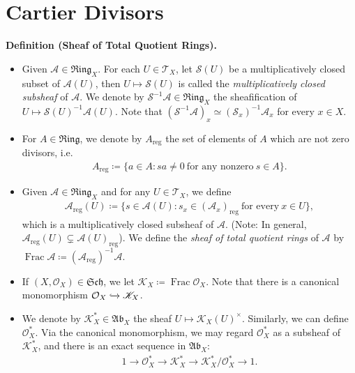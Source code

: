 \documentclass[11pt,a4paper,footinclude=true,headinclude=true]{scrbook} %
\DeclareMathOperator{\Frac}{Frac}
\newcommand{\KK}{\mathscr{K}}
\newcommand{\OO}{\mathcal{O}}
\newcommand{\Ss}{\mathscr{S}}
\newcommand{\TT}{\mathcal{T}}
\newcommand{\Aa}{\mathscr{A}}
\newcommand{\reg}{\mathrm{reg}}
\newcommand{\Sch}{\mathfrak{Sch}}
\newcommand{\Ab}{\mathfrak{Ab}}
\newcommand{\Ring}{\mathfrak{Ring}}
\newcommand{\<}{\langle}
\newcommand{\>}{\rangle}
\newenvironment{definition}[2][Definition]
    { \begin{mdframed}[backgroundcolor=gray!20] \textbf{#1 #2.}\ }
    {  \end{mdframed}}
\begin{document}
\section{Cartier Divisors}
\begin{definition}{(Sheaf of Total Quotient Rings)}
    \begin{itemize}
        \item Given $\Aa\in\Ring_X$. For each $U\in\TT_X$, let $\Ss(U)$ be a multiplicatively closed subset of $\Aa(U)$, then $U\mapsto\Ss(U)$ is called the \textit{multiplicatively closed subsheaf} of $\Aa$. We denote by $\Ss^{-1}\Aa\in\Ring_X$ the sheafification of $U\mapsto\Ss(U)^{-1}\Aa(U)$. Note that $(\Ss^{-1}\Aa)_x\simeq(\Ss_x)^{-1}\Aa_x$ for every $x\in X$.
        \item For $A\in\Ring$, we denote by $A_\reg$ the set of elements of $A$ which are not zero divisors, i.e.
        \begin{align*}
            A_\reg\coloneqq\{a\in A:sa\neq0\ \text{for any nonzero}\ s\in A\}.
        \end{align*}
        \item Given $\Aa\in\Ring_X$ and for any $U\in\TT_X$, we define
        \begin{align*}
            \Aa_\reg(U)\coloneqq\{s\in\Aa(U):s_x\in(\Aa_x)_\reg\ \text{for every}\ x\in U\},
        \end{align*}
        which is a multiplicatively closed subsheaf of $\Aa$. (Note: In general, $\Aa_\reg(U)\subsetneq\Aa(U)_\reg$). We define the \textit{sheaf of total quotient rings} of $\Aa$ by $\Frac\Aa\coloneqq(\Aa_\reg)^{-1}\Aa$.
        \item If $(X,\OO_X)\in\Sch$, we let $\KK_X\coloneqq\Frac\OO_X$. Note that there is a canonical monomorphism $\OO_X\xhookrightarrow{}\KK_X$.
        \item We denote by $\KK_X^\ast\in\Ab_X$ the sheaf $U\mapsto\KK_X(U)^\times$. Similarly, we can define $\OO_X^\ast$. Via the canonical monomorphism, we may regard $\OO_X^\ast$ as a subsheaf of $\KK_X^\ast$, and there is an exact sequence in $\Ab_X$:
        \begin{align*}
            1\longrightarrow\OO_X^\ast\longrightarrow\KK_X^\ast\longrightarrow\KK_X^\ast/\OO_X^\ast\longrightarrow1.
        \end{align*}
    \end{itemize}
\end{definition}
\end{document}
